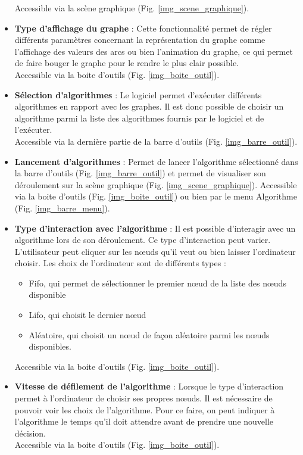 \documentclass[11pt,a4paper]{article}
\begin{document}
\begin{itemize}
				Accessible via la scène graphique (Fig. \ref{img_scene_graphique}).
				\item \textbf{Type d'affichage du graphe }: Cette fonctionnalité permet de régler différents paramètres concernant la représentation du graphe comme l'affichage des valeurs des arcs ou bien l'animation du graphe, ce qui permet de faire bouger le graphe pour le rendre le plus clair possible.\\
				Accessible via la boite d'outils (Fig. \ref{img_boite_outil}).
				\item \textbf{Sélection d'algorithmes }: Le logiciel permet d'exécuter différents algorithmes en rapport avec les graphes. Il est donc possible de choisir un algorithme parmi la liste des algorithmes fournis par le logiciel et de l'exécuter.\\
				Accessible via la dernière partie de la barre d'outils (Fig. \ref{img_barre_outil}).
				\item \textbf{Lancement d'algorithmes }: Permet de lancer l'algorithme sélectionné dans la barre d'outils (Fig. \ref{img_barre_outil}) et permet de visualiser son déroulement sur la scène graphique (Fig. \ref{img_scene_graphique}).
				Accessible via la boite d'outils (Fig. \ref{img_boite_outil}) ou bien par le menu Algorithme (Fig. \ref{img_barre_menu}).
				\item \textbf{Type d'interaction avec l'algorithme }: Il est possible d'interagir avec un algorithme lors de son déroulement. Ce type d'interaction peut varier. L'utilisateur peut cliquer sur les n\oe uds qu'il veut ou bien laisser l'ordinateur choisir. Les choix de l'ordinateur sont de différents types : 
				\begin{itemize}
					\item Fifo, qui permet de sélectionner le premier n\oe ud de la liste des n\oe uds disponible
					\item Lifo, qui choisit le dernier n\oe ud
					\item Aléatoire, qui choisit un n\oe ud de façon aléatoire parmi les n\oe uds disponibles.
				\end{itemize}
				Accessible via la boite d'outils (Fig. \ref{img_boite_outil}).
				\item \textbf{Vitesse de défilement de l'algorithme }: Lorsque le type d'interaction permet à l'ordinateur de choisir ses propres n\oe uds. Il est nécessaire de pouvoir voir les choix de l'algorithme. Pour ce faire, on peut indiquer à l'algorithme le temps qu'il doit attendre avant de prendre une nouvelle décision.\\
				Accessible via la boite d'outils (Fig. \ref{img_boite_outil}).
			\end{itemize}
		
\end{document}
